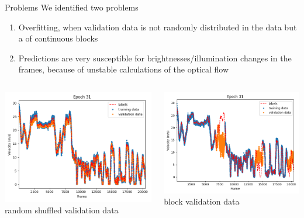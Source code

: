 \begin{frame}{Problems}
	We identified two problems
	\begin{enumerate}
		\item Overfitting, when validation data is not randomly distributed in the data but a of continuous blocks
		\item Predictions are very susceptible for brightnesses/illumination changes in the frames, because of unstable calculations of the optical flow
	\end{enumerate}
	\begin{columns}[c]
		\begin{column}{0.5\textwidth}
			\begin{center}
			\includegraphics[width=\textwidth]{imgs/siamese_offrames_performance_shuffle.png}
			random shuffled validation data
			\end{center}
		\end{column}
		\begin{column}{0.5\textwidth}
			\begin{center}
			\includegraphics[width=\textwidth]{imgs/siamese_offrames_performance.png}
			block validation data
			\end{center}
		\end{column}
	\end{columns}
\end{frame}

